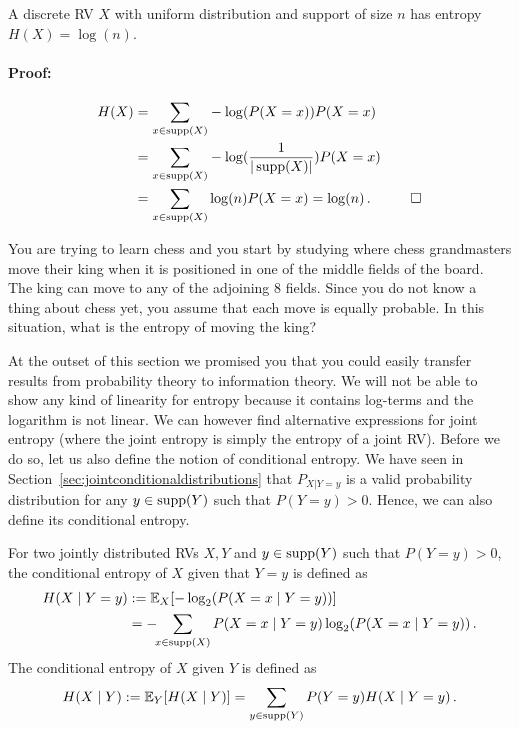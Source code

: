 \begin{Theorem}
A discrete RV $ X $ with uniform distribution and support of size $ n $ has entropy
$ H(X) = \log(n) $.
\end{Theorem}

\paragraph{Proof:}
\begin{align}
H(X) &= \underset{x \in \operatorname{supp}(X)}{\sum}-\log(P(X=x))P(X=x) \\
&= \underset{x \in \operatorname{supp}(X)}{\sum} -\log(\frac{1}{|\operatorname{supp}(X)|})P(X=x) \\
&= \underset{x \in \operatorname{supp}(X)}{\sum}\log(n)P(X=x) = \log(n) \, .
\hspace{1cm} \square
\end{align}

\begin{Exercise}
You are trying to learn chess and you start by studying where chess grandmasters move their king when it
is positioned in one of the middle fields of the board. The king can move to any of the adjoining 8 fields. Since
you do not know a thing about chess yet, you assume that each move is equally probable. In this situation,
what is the entropy of moving the king?
\end{Exercise}

At the outset of this section we promised you that you could easily transfer results from probability 
theory to information theory. We will not be able to show any kind of linearity for entropy because it contains
log-terms and the logarithm is not linear. We can however find alternative expressions for joint entropy (where 
the joint entropy is simply the entropy of a joint RV). Before we do so, let us also define the notion of 
conditional entropy. We have seen in Section~\ref{sec:jointconditionaldistributions} that $P_{X|Y=y}$ is a valid probability distribution for any $y \in \operatorname{supp}(Y)$ such that $P(Y=y)>0$. Hence, we can also define its conditional entropy.

\begin{Definition}
For two jointly distributed RVs $ X,Y $ and $y \in \operatorname{supp}(Y)$ such that $P(Y=y)>0$, the conditional entropy of $ X $ given that $ Y=y $ is defined as
\begin{align*}
H(X \mid Y=y) &:= \mathbb{E}_X[-\log_{2}(P(X=x \mid Y=y))] \\
&= - \!\! \sum_{x \in \operatorname{supp}(X)} P(X=x \mid Y=y) \log_2(P(X=x \mid Y=y))\, . 
\end{align*}
The conditional entropy of $X$ given $Y$ is defined as
$$ H(X \mid Y) := \mathbb{E}_Y[ H(X \mid Y) ] = \sum_{y \in \operatorname{supp}(Y)} P(Y=y) H(X \mid Y=y) \, .$$
\end{Definition}

